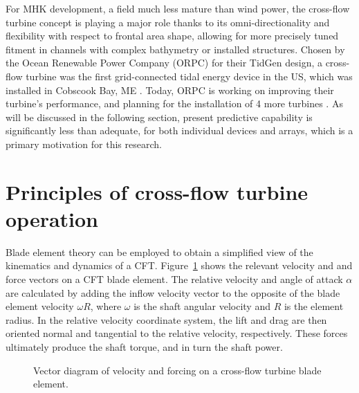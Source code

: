 For MHK development, a field much less mature than wind power, the cross-flow
turbine concept is playing a major role thanks to its omni-directionality and
flexibility with respect to frontal area shape, allowing for more precisely
tuned fitment in channels with complex bathymetry or installed structures.
Chosen by the Ocean Renewable Power Company (ORPC) for their TidGen design, a
cross-flow turbine was the first grid-connected tidal energy device in the US,
which was installed in Cobscook Bay, ME \cite{ORPC2012}. Today, ORPC is working
on improving their turbine's performance, and planning for the installation of 4
more turbines \cite{Nelson2013}. As will be discussed in the following section,
present predictive capability is significantly less than adequate, for both
individual devices and arrays, which is a primary motivation for this research.


\section{Principles of cross-flow turbine operation}

Blade element theory can be employed to obtain a simplified view of the
kinematics and dynamics of a CFT. Figure~\ref{fig:vectors} shows the relevant
velocity and and force vectors on a CFT blade element. The relative velocity and
angle of attack $\alpha$ are calculated by adding the inflow velocity vector to
the opposite of the blade element velocity $\omega R$, where $\omega$ is the
shaft angular velocity and $R$ is the element radius. In the relative velocity
coordinate system, the lift and drag are then oriented normal and tangential to
the relative velocity, respectively. These forces ultimately produce the shaft
torque, and in turn the shaft power. 

\begin{figure}[ht]
    \centering
    
    \caption{Vector diagram of velocity and forcing on a cross-flow turbine
        blade element.}
    
    \label{fig:vectors}
\end{figure}

